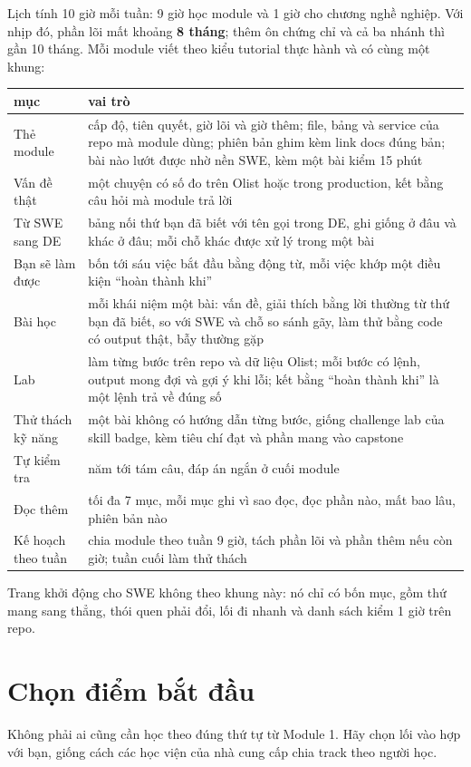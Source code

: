 \documentclass[11pt,a4paper,oneside]{report}
\newcommand{\thd}[1]{\textbf{\sffamily\small #1}}
\begin{document}
Lịch tính 10 giờ mỗi tuần: 9 giờ học module và 1 giờ cho chương nghề nghiệp. Với nhịp đó, phần lõi mất khoảng \textbf{8 tháng}; thêm ôn chứng chỉ và cả ba nhánh thì gần 10 tháng. Mỗi module viết theo kiểu tutorial thực hành và có cùng một khung:

\begin{xltabular}{\textwidth}{@{}P{3.6cm} L@{}}
\toprule
\thd{mục} & \thd{vai trò} \\
\midrule
\endhead
\bottomrule
\endfoot
Thẻ module & cấp độ, tiên quyết, giờ lõi và giờ thêm; file, bảng và service của repo mà module dùng; phiên bản ghim kèm link docs đúng bản; bài nào lướt được nhờ nền SWE, kèm một bài kiểm 15 phút \\
Vấn đề thật & một chuyện có số đo trên Olist hoặc trong production, kết bằng câu hỏi mà module trả lời \\
Từ SWE sang DE & bảng nối thứ bạn đã biết với tên gọi trong DE, ghi giống ở đâu và khác ở đâu; mỗi chỗ khác được xử lý trong một bài \\
Bạn sẽ làm được & bốn tới sáu việc bắt đầu bằng động từ, mỗi việc khớp một điều kiện ``hoàn thành khi'' \\
Bài học & mỗi khái niệm một bài: vấn đề, giải thích bằng lời thường từ thứ bạn đã biết, so với SWE và chỗ so sánh gãy, làm thử bằng code có output thật, bẫy thường gặp \\
Lab & làm từng bước trên repo và dữ liệu Olist; mỗi bước có lệnh, output mong đợi và gợi ý khi lỗi; kết bằng ``hoàn thành khi'' là một lệnh trả về đúng số \\
Thử thách kỹ năng & một bài không có hướng dẫn từng bước, giống challenge lab của skill badge, kèm tiêu chí đạt và phần mang vào capstone \\
Tự kiểm tra & năm tới tám câu, đáp án ngắn ở cuối module \\
Đọc thêm & tối đa 7 mục, mỗi mục ghi vì sao đọc, đọc phần nào, mất bao lâu, phiên bản nào \\
Kế hoạch theo tuần & chia module theo tuần 9 giờ, tách phần lõi và phần thêm nếu còn giờ; tuần cuối làm thử thách \\
\end{xltabular}
Trang khởi động cho SWE không theo khung này: nó chỉ có bốn mục, gồm thứ mang sang thẳng, thói quen phải đổi, lối đi nhanh và danh sách kiểm 1 giờ trên repo.

\section{Chọn điểm bắt đầu}
Không phải ai cũng cần học theo đúng thứ tự từ Module 1. Hãy chọn lối vào hợp với bạn, giống cách các học viện của nhà cung cấp chia track theo người học.
\end{document}
